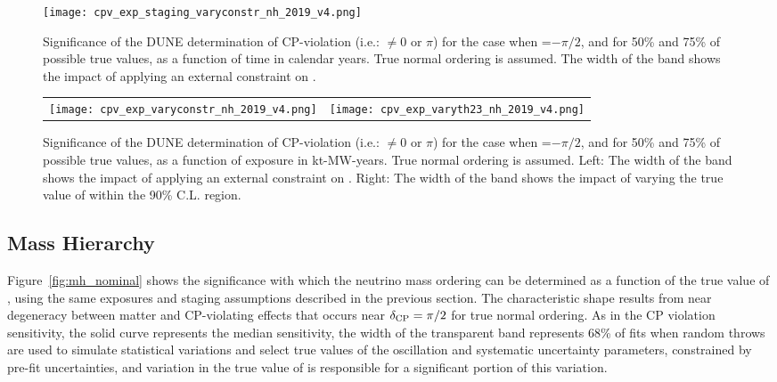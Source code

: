 \begin{figure}[h!]
    \centering
		\texttt{[image: cpv\_exp\_staging\_varyconstr\_nh\_2019\_v4.png]}
	\caption[Significance of the DUNE determination of CP-violation as a function of time]{Significance of the DUNE determination of CP-violation (i.e.: \deltacp $\neq 0$ or $\pi$) for the case when \deltacp=$-\pi/2$, and for 50\% and 75\% of possible true \deltacp values, as a function of time in calendar years. True normal ordering is assumed. The width of the band shows the impact of applying an external constraint on .}
    \label{fig:cpv_staging}
\end{figure}

\begin{figure}[h!]
    \centering
    \begin{tabular}{cc}
		\texttt{[image: cpv\_exp\_varyconstr\_nh\_2019\_v4.png]} &
		\texttt{[image: cpv\_exp\_varyth23\_nh\_2019\_v4.png]}
    \end{tabular}
	\caption[Significance of the DUNE determination of CP-violation as a function of exposure]{Significance of the DUNE determination of CP-violation (i.e.: \deltacp $\neq 0$ or $\pi$) for the case when \deltacp=$-\pi/2$, and for 50\% and 75\% of possible true \deltacp values, as a function of exposure in kt-MW-years. True normal ordering is assumed. Left: The width of the band shows the impact of applying an external constraint on . Right: The width of the band shows the impact of varying the true value of  within the  90\% C.L. region.}
    \label{fig:cpv_exposure}
\end{figure}

\subsection{Mass Hierarchy}
\label{sec:physics-lbnosc-mh}


Figure~\ref{fig:mh_nominal} shows the significance with which the neutrino mass ordering can be determined as a function of the true value of \deltacp, using the same exposures and staging assumptions described in the previous section. The characteristic shape results from near degeneracy between matter and CP-violating effects that occurs near $\delta_{\rm CP}=\pi/2$ for true normal ordering.
As in the CP violation sensitivity, the solid curve represents the median sensitivity, the width of the transparent band represents 68\% of fits when random throws are used to simulate statistical variations and select true values of the oscillation and systematic uncertainty parameters, constrained by pre-fit uncertainties, and variation in the true value of  is responsible for a significant portion of this variation.

